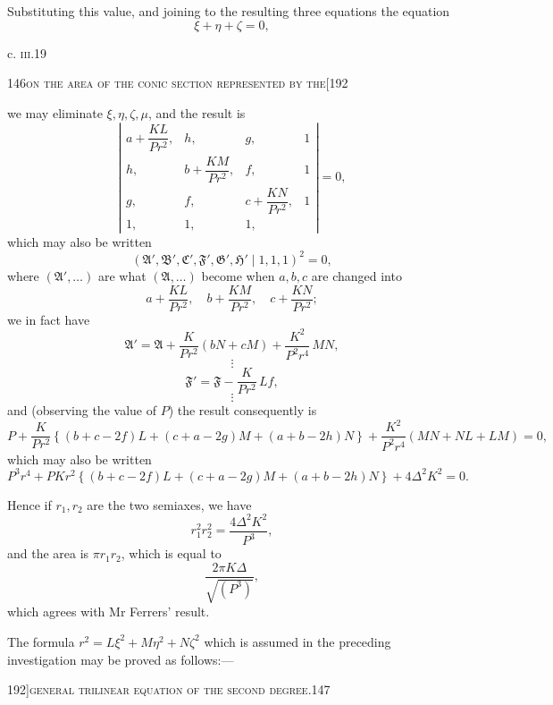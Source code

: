 \documentclass[11pt]{article}
\begin{document}
Substituting this value, and joining to the resulting three equations the equation
\[
\xi + \eta + \zeta = 0,
\]

\bigskip

\hfill c. \textsc{iii}.\hfill 19

\bigskip

\begin{center}\small 146\hfill\textsc{on the area of the conic section represented by the}\hfill [192\end{center}

\medskip

\noindent we may eliminate $\xi, \eta, \zeta, \mu$, and the result is
\[
\left| \begin{array}{cccc} a + \dfrac{KL}{P r^{2}}, & h, & g, & 1 \\[6pt] h, & b + \dfrac{KM}{P r^{2}}, & f, & 1 \\[6pt] g, & f, & c + \dfrac{KN}{P r^{2}}, & 1 \\[6pt] 1, & 1, & 1, & \end{array} \right| = 0,
\]
which may also be written
\[
(\mathfrak{A}', \mathfrak{B}', \mathfrak{C}', \mathfrak{F}', \mathfrak{G}', \mathfrak{H}' \mid 1, 1, 1)^{2} = 0,
\]
where $(\mathfrak{A}', \dots)$ are what $(\mathfrak{A}, \dots)$ become when $a, b, c$ are changed into
\[
a + \frac{KL}{P r^{2}},\quad b + \frac{KM}{P r^{2}},\quad c + \frac{KN}{P r^{2}};
\]
we in fact have
\[
\mathfrak{A}' = \mathfrak{A} + \frac{K}{P r^{2}}(bN + cM) + \frac{K^{2}}{P^{2} r^{4}}\, MN,
\]
\[
\vdots
\]
\[
\mathfrak{F}' = \mathfrak{F} - \frac{K}{P r^{2}}\, Lf,
\]
\[
\vdots
\]
and (observing the value of $P$) the result consequently is
\[
P + \frac{K}{P r^{2}}\left\{(b + c - 2f) L + (c + a - 2g) M + (a + b - 2h) N\right\} + \frac{K^{2}}{P^{2} r^{4}}(MN + NL + LM) = 0,
\]
which may also be written
\[
P^{3} r^{4} + P K r^{2}\left\{(b + c - 2f) L + (c + a - 2g) M + (a + b - 2h) N\right\} + 4\Delta^{2} K^{2} = 0.
\]

Hence if $r_{1}, r_{2}$ are the two semiaxes, we have
\[
r_{1}^{2} r_{2}^{2} = \frac{4\Delta^{2} K^{2}}{P^{3}},
\]
and the area is $\pi r_{1} r_{2}$, which is equal to
\[
\frac{2\pi K \Delta}{\sqrt{(P^{3})}},
\]
which agrees with Mr Ferrers' result.

The formula $r^{2} = L\xi^{2} + M\eta^{2} + N\zeta^{2}$ which is assumed in the preceding investigation may be proved as follows:---

\bigskip

\begin{center}\small 192]\hfill\textsc{general trilinear equation of the second degree.}\hfill 147\end{center}
\end{document}
